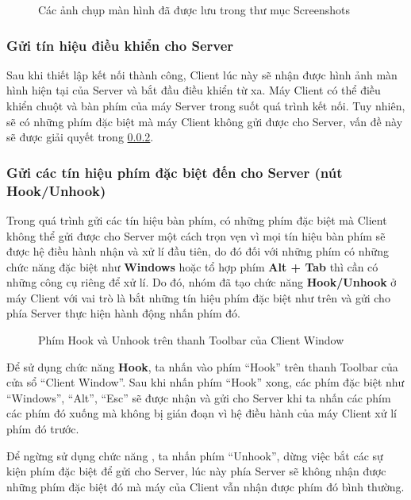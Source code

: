 \begin{figure}[H]
	\caption{Các ảnh chụp màn hình đã được lưu trong thư mục Screenshots}
	\label{fig:ScreenshotsDirectory}
\end{figure}

\subsubsection{Gửi tín hiệu điều khiển cho Server}
Sau khi thiết lập kết nối thành công, Client lúc này sẽ nhận được hình ảnh màn hình hiện tại của Server và bắt đầu điều khiển từ xa. Máy Client có thể điều khiển chuột và bàn phím của máy Server trong suốt quá trình kết nối. Tuy nhiên, sẽ có những phím đặc biệt mà máy Client không gửi được cho Server, vấn đề này sẽ được giải quyết trong \ref{sec:HookUnhookSection}.

\subsubsection{Gửi các tín hiệu phím đặc biệt đến cho Server (nút Hook/Unhook)}\label{sec:HookUnhookSection}
Trong quá trình gửi các tín hiệu bàn phím, có những phím đặc biệt mà Client không thể gửi được cho Server một cách trọn vẹn vì mọi tín hiệu bàn phím sẽ được hệ điều hành nhận và xử lí đầu tiên, do đó đối với những phím có những chức năng đặc biệt như \textbf{Windows} hoặc tổ hợp phím \textbf{Alt + Tab} thì cần có những công cụ riêng để xử lí. Do đó, nhóm đã tạo chức năng \textbf{Hook/Unhook} ở máy Client với vai trò là bắt những tín hiệu phím đặc biệt như trên và gửi cho phía Server thực hiện hành động nhấn phím đó.

\begin{figure}[H]
	\caption{Phím Hook và Unhook trên thanh Toolbar của Client Window}
	\label{fig:HookUnHookButtons}
\end{figure}

Để sử dụng chức năng \textbf{Hook}, ta nhấn vào phím ``Hook'' trên thanh Toolbar của cửa sổ ``Client Window''. Sau khi nhấn phím ``Hook'' xong, các phím đặc biệt như ``Windows'', ``Alt'', ``Esc'' sẽ được nhận và gửi cho Server khi ta nhấn các phím các phím đó xuống mà không bị gián đoạn vì hệ điều hành của máy Client xử lí phím đó trước.

Để ngừng sử dụng chức năng , ta nhấn phím ``Unhook'', dừng việc bắt các sự kiện phím đặc biệt để gửi cho Server, lúc này phía Server sẽ không nhận được những phím đặc biệt đó mà máy của Client vẫn nhận được phím đó bình thường.